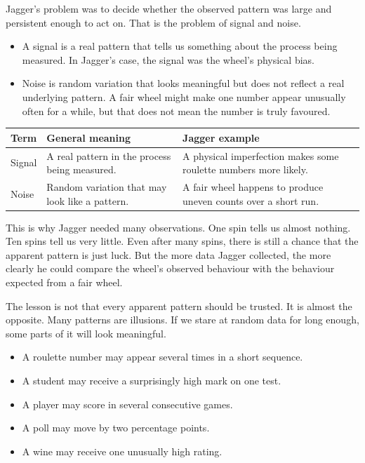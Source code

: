 \documentclass[
  letterpaper,
  DIV=11,
  numbers=noendperiod]{scrreprt}
\providecommand{\tightlist}{%
  \setlength{\itemsep}{0pt}\setlength{\parskip}{0pt}}
\begin{document}
\begin{tcolorbox}
Jagger's problem was to decide whether the observed pattern was large
and persistent enough to act on. That is the problem of signal and
noise.

\begin{itemize}
\tightlist
\item
  A signal is a real pattern that tells us something about the process
  being measured. In Jagger's case, the signal was the wheel's physical
  bias.
\item
  Noise is random variation that looks meaningful but does not reflect a
  real underlying pattern. A fair wheel might make one number appear
  unusually often for a while, but that does not mean the number is
  truly favoured.
\end{itemize}

\begin{table}
\fontsize{12.0pt}{14.0pt}\selectfont
\begin{tabular*}{\linewidth}{@{\extracolsep{\fill}}lll}
\toprule
Term & General meaning & Jagger example \\ 
\midrule\addlinespace[2.5pt]
Signal & A real pattern in the process being measured. & A physical imperfection makes some roulette numbers more likely. \\ 
Noise & Random variation that may look like a pattern. & A fair wheel happens to produce uneven counts over a short run. \\ 
\bottomrule
\end{tabular*}
\end{table}

This is why Jagger needed many observations. One spin tells us almost
nothing. Ten spins tell us very little. Even after many spins, there is
still a chance that the apparent pattern is just luck. But the more data
Jagger collected, the more clearly he could compare the wheel's observed
behaviour with the behaviour expected from a fair wheel.

The lesson is not that every apparent pattern should be trusted. It is
almost the opposite. Many patterns are illusions. If we stare at random
data for long enough, some parts of it will look meaningful.

\begin{itemize}
\tightlist
\item
  A roulette number may appear several times in a short sequence.
\item
  A student may receive a surprisingly high mark on one test.
\item
  A player may score in several consecutive games.
\item
  A poll may move by two percentage points.
\item
  A wine may receive one unusually high rating.
\end{itemize}


\end{tcolorbox}
\end{document}
